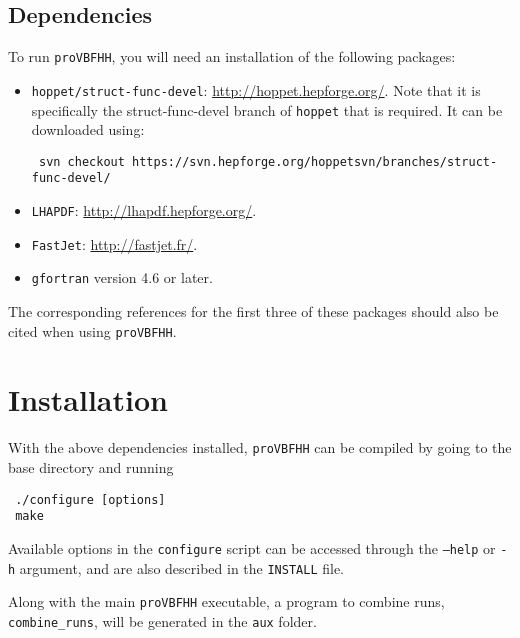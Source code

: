 \documentclass[12pt,a4]{article}
\newcommand{\provbfhh}{\texttt{proVBFHH}\xspace}
\newcommand{\hoppet}{\texttt{hoppet}\xspace}
\begin{document}
\subsection{Dependencies}
To run \provbfhh, you will need an installation of the following packages:
\begin{itemize}
\item \texttt{hoppet/struct-func-devel}:
  \url{http://hoppet.hepforge.org/}.  Note that it is specifically the
  struct-func-devel branch of \hoppet that is required.  It can be
  downloaded using:
\begin{verbatim}
 svn checkout https://svn.hepforge.org/hoppetsvn/branches/struct-func-devel/
\end{verbatim}
\item \texttt{LHAPDF}: \url{http://lhapdf.hepforge.org/}.
\item \texttt{FastJet}: \url{http://fastjet.fr/}.
\item \texttt{gfortran} version 4.6 or later.
\end{itemize}
%
The corresponding references for the first three of these packages
should also be cited when using \provbfhh.

\section{Installation}
With the above dependencies installed, \provbfhh can be compiled by
going to the base directory and running
\begin{verbatim}
 ./configure [options]
 make
\end{verbatim}
Available options in the \texttt{configure} script can be accessed
through the \texttt{--help} or \texttt{-h} argument, and are also
described in the \texttt{INSTALL} file.

Along with the main \provbfhh executable, a program to combine runs,
\texttt{combine\_runs}, will be generated in the \texttt{aux} folder.

\end{document}
